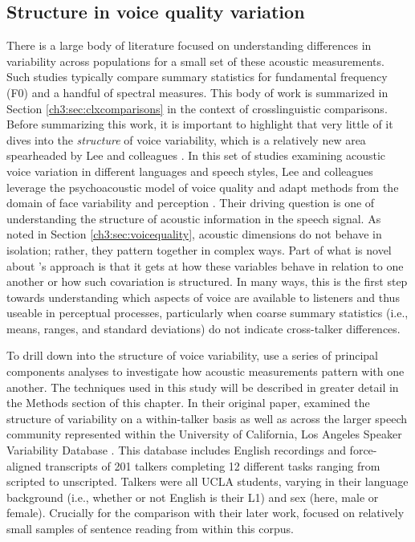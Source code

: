\subsection{Structure in voice quality variation}

There is a large body of literature focused on understanding differences in variability across populations for a small set of these acoustic measurements. Such studies typically compare summary statistics for fundamental frequency (F0) and a handful of spectral measures. This body of work is summarized in Section \ref{ch3:sec:clxcomparisons} in the context of crosslinguistic comparisons. Before summarizing this work, it is important to highlight that very little of it dives into the \textit{structure} of voice variability, which is a relatively new area spearheaded by Lee and colleagues \citep{lee_2019_acoustic, lee_2019_spontaneous, lee_2020_language}. In this set of studies examining acoustic voice variation in different languages and speech styles, Lee and colleagues leverage the psychoacoustic model of voice quality \citep{kreiman_2014_theory} and adapt methods from the domain of face variability and perception \citep{burton_2016_faces}. Their driving question is one of understanding the structure of acoustic information in the speech signal. As noted in Section \ref{ch3:sec:voicequality}, acoustic dimensions do not behave in isolation; rather, they pattern together in complex ways. Part of what is novel about \citeauthor{lee_2019_acoustic}'s approach is that it gets at how these variables behave in relation to one another or how such covariation is structured. In many ways, this is the first step towards understanding which aspects of voice are available to listeners and thus useable in perceptual processes, particularly when coarse summary statistics (i.e., means, ranges, and standard deviations) do not indicate cross-talker differences. 

To drill down into the structure of voice variability, \citet{lee_2019_acoustic} use a series of principal components analyses to investigate how acoustic measurements pattern with one another. The techniques used in this study will be described in greater detail in the Methods section of this chapter. In their original paper, \citet{lee_2019_acoustic} examined the structure of variability on a within-talker basis as well as across the larger speech community represented within the University of California, Los Angeles Speaker Variability Database \citep{keating_2019_database}. This database includes English recordings and force-aligned transcripts of 201 talkers completing 12 different tasks ranging from scripted to unscripted. Talkers were all UCLA students, varying in their language background (i.e., whether or not English is their L1) and sex (here, male or female). Crucially for the comparison with their later work, \citet{lee_2019_acoustic} focused on relatively small samples of sentence reading from within this corpus. 

